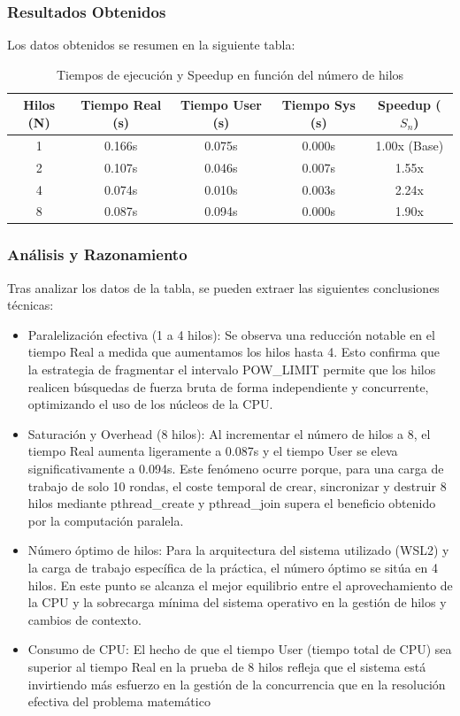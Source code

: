 \documentclass[12pt,a4paper]{article}
\begin{document}
\subsubsection{Resultados Obtenidos}
 Los datos obtenidos se resumen en la siguiente tabla:
\begin{table}[H]
\centering
\begin{tabular}{|c|c|c|c|c|}
\hline
\textbf{Hilos (N)} & \textbf{Tiempo Real (s)} & \textbf{Tiempo User (s)} & \textbf{Tiempo Sys (s)} & \textbf{Speedup ($S_n$)} \\ \hline
1 & 0.166s & 0.075s & 0.000s & 1.00x (Base) \\ \hline
2 & 0.107s & 0.046s & 0.007s & 1.55x \\ \hline
4 & 0.074s & 0.010s & 0.003s & 2.24x \\ \hline
8 & 0.087s & 0.094s & 0.000s & 1.90x \\ \hline
\end{tabular}
\caption{Tiempos de ejecución y Speedup en función del número de hilos}
\label{tab:tiempos_hilos}
\end{table}
\subsubsection{Análisis y Razonamiento}
Tras analizar los datos de la tabla, se pueden extraer las siguientes
conclusiones técnicas:
\begin{itemize}
    \item Paralelización efectiva (1 a 4 hilos): Se observa una reducción notable en el tiempo Real a medida que aumentamos los hilos hasta 4. Esto confirma que la estrategia de fragmentar el intervalo POW\_LIMIT permite que los hilos realicen búsquedas de fuerza bruta de forma independiente y concurrente, optimizando el uso de los núcleos de la CPU.
    \item Saturación y Overhead (8 hilos): Al incrementar el número de hilos a 8, el tiempo Real aumenta ligeramente a 0.087s y el tiempo User se eleva significativamente a 0.094s. Este fenómeno ocurre porque, para una carga de trabajo de solo 10 rondas, el coste temporal de crear, sincronizar y destruir 8 hilos mediante pthread\_create y pthread\_join supera el beneficio obtenido por la computación paralela.
    \item Número óptimo de hilos: Para la arquitectura del sistema utilizado (WSL2) y la carga de trabajo específica de la práctica, el número óptimo se sitúa en 4 hilos. En este punto se alcanza el mejor equilibrio entre el aprovechamiento de la CPU y la sobrecarga mínima del sistema operativo en la gestión de hilos y cambios de contexto.
    \item Consumo de CPU: El hecho de que el tiempo User (tiempo total de CPU) sea superior al tiempo Real en la prueba de 8 hilos refleja que el sistema está invirtiendo más esfuerzo en la gestión de la concurrencia que en la resolución efectiva del problema matemático
\end{itemize}
\end{document}
